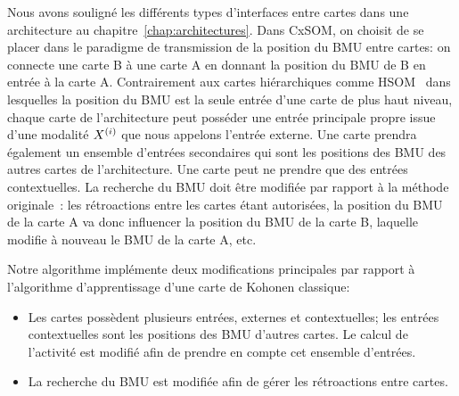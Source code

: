\documentclass[../main]{subfiles}
\begin{document}
Nous avons souligné les différents types d'interfaces entre cartes dans une architecture au chapitre~\ref{chap:architectures}.
Dans CxSOM, on choisit de se placer dans le paradigme de transmission de la position du BMU entre cartes: on connecte une carte B à une carte A en donnant la position du BMU de B en entrée à la carte A. 
Contrairement aux cartes hiérarchiques comme HSOM~\parencite{lampinen_clustering_1992} dans lesquelles la position du BMU est la seule entrée d'une carte de plus haut niveau, chaque carte de l'architecture peut posséder une entrée principale propre issue d'une modalité $X^{({i})}$ que nous appelons l'entrée externe. 
Une carte prendra également un ensemble d'entrées secondaires qui sont les positions des BMU des autres cartes de l'architecture. 
Une carte peut ne prendre que des entrées contextuelles.
La recherche du BMU doit être modifiée par rapport à la méthode originale~: les rétroactions entre les cartes étant autorisées, la position du BMU de la carte A va donc influencer la position du BMU de la carte B, laquelle modifie à nouveau le BMU de la carte A, etc. 

Notre algorithme implémente deux modifications principales par rapport à l'algorithme d'apprentissage d'une carte de Kohonen classique: 
\begin{itemize}
\item Les cartes possèdent plusieurs entrées, externes et contextuelles; les entrées contextuelles sont les positions des BMU d'autres cartes. Le calcul de l'activité est modifié afin de prendre en compte cet ensemble d'entrées.
\item La recherche du BMU est modifiée afin de gérer les rétroactions entre cartes.
\end{itemize}
\end{document}
